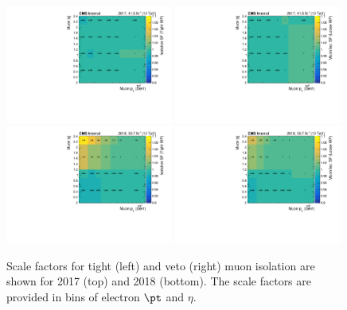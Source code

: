 \begin{figure}[ht!]
    \begin{center}
        \includegraphics[width=0.49\textwidth]{fig/efficiency/lepton/muon_eff_tight_iso_2017.pdf}
        \includegraphics[width=0.49\textwidth]{fig/efficiency/lepton/muon_eff_loose_iso_2017.pdf}\\
        \includegraphics[width=0.49\textwidth]{fig/efficiency/lepton/muon_eff_tight_iso_2018.pdf}
        \includegraphics[width=0.49\textwidth]{fig/efficiency/lepton/muon_eff_loose_iso_2018.pdf}
        \caption{
            Scale factors for tight (left) and veto (right) muon isolation are shown for 2017 (top) and
            2018 (bottom). The scale factors are provided in bins of electron $\pt$ and $\eta$.
          }
      \label{fig:sf_muon_iso}
    \end{center}
  \end{figure}


